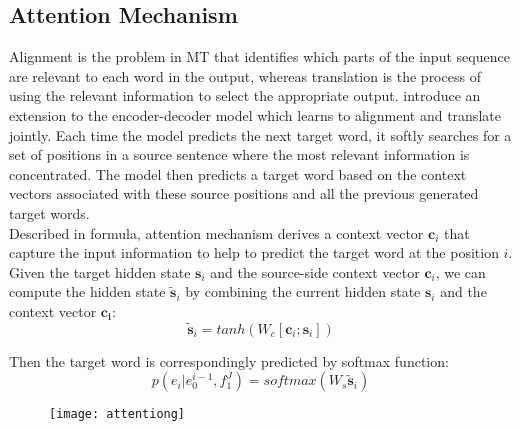 \subsection{Attention Mechanism}
Alignment is the problem in MT that identifies which parts of the input sequence are relevant to each word in the output, whereas translation is the process of using the relevant information to select the appropriate output.
\cite{DBLP:journals/corr/BahdanauCB14} introduce an extension to the encoder-decoder model which learns to alignment and translate jointly. Each time the model predicts the next target word, it softly searches for a set of positions in a source sentence where the most relevant information is concentrated. The model then predicts a target word based on the context vectors associated with these source positions and all the previous generated target words.\\
Described in formula, attention mechanism derives a context vector ${\bm{c}_i}$ that capture the input information to help to predict the target word at the position ${i}$. Given the target hidden state ${\bm{s}_i}$ and the source-side context vector $\bm{c}_i$, we can compute the hidden state ${\tilde{\bm{s}}_i}$ by combining the current hidden state $\bm{s}_i$ and the context vector $\bm{c_i}$:
\[ \tilde{\bm{s}}_i = tanh(W_c[\bm{c}_i; \bm{s}_i])\]

Then the target word is correspondingly predicted by softmax function:
\[  p(e_i|e_0^{i-1}, f_1^J) = softmax(W_s \tilde{\bm{s}}_i)\] 

\begin{figure}
	\centering
	\texttt{[image: attentiong]}
\end{figure}


